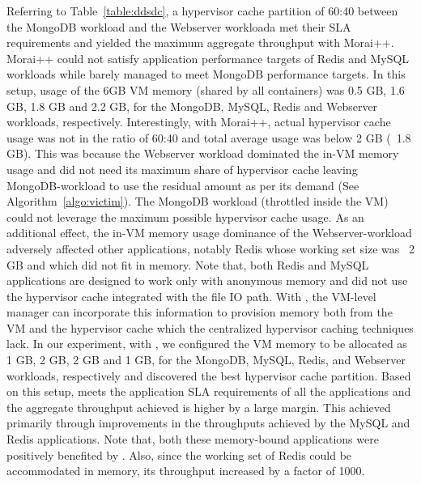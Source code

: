Referring to Table~\ref{table:ddsdc}, a hypervisor cache partition of 60:40 
between the MongoDB workload and the Webserver workloada met their SLA requirements
and yielded the maximum aggregate throughput with Morai++.
%
Morai++ could not satisfy application performance targets of Redis and MySQL 
workloads while barely managed to meet MongoDB performance targets. 
%
In this setup, usage of the 6GB VM memory (shared
by all containers) was 0.5 GB, 1.6 GB, 1.8 GB and 2.2 GB, for the 
MongoDB, MySQL,
Redis and Webserver workloads, respectively.
%
%
Interestingly, with Morai++, actual hypervisor cache usage was not in the ratio of 60:40
and total average usage was below 2 GB (~1.8 GB).
%
%
%
%
%
This was because the Webserver workload dominated the in-VM memory usage 
and did not need its maximum share of hypervisor cache leaving MongoDB-workload
to use the residual amount as per its demand (See Algorithm~\ref{algo:victim}).
%
The MongoDB workload (throttled inside the VM) could not leverage the
maximum possible hypervisor cache usage. 
%
As an additional effect, the in-VM memory usage dominance of the Webserver-workload
adversely affected other applications, notably Redis whose
working set size was ~2 GB and which did not fit in memory.
%
Note that, both Redis and MySQL applications are designed
to work only with anonymous memory and did not use the hypervisor cache
integrated with the file IO path.
%
%
%
With \dd{}, the VM-level manager can incorporate this information to
provision memory both from the VM and the hypervisor cache which
%
the centralized hypervisor caching techniques lack. 
%
In our experiment, with \dd{}, we configured the VM memory to be allocated
as 1 GB, 2 GB, 2 GB and 1 GB, for the MongoDB, MySQL, Redis, and Webserver
workloads, respectively and discovered the best hypervisor cache
partition.
%
Based on this setup, \dd{} meets the application SLA requirements
of all the applications and the aggregate throughput achieved is higher
by a large margin.
%
This achieved primarily through improvements in the throughputs achieved
by the MySQL and Redis applications.
%
Note that, both these memory-bound applications were positively 
benefited by \dd{}.
%
Also, since the working set of Redis could be accommodated in memory,
its throughput increased by a factor of 1000.


